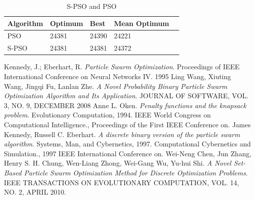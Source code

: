 \documentclass{article}
\begin{document}
\begin{table}[h]
\begin{tabular}{|l|l|l|l|l|}
	\hline
	Algorithm & Optimum & Best & Mean Optimum\\ \hline
	PSO & 24381 & 24390 & 24221\\ \hline
	S-PSO & 24381 & 24381 & 24372\\ \hline
\end{tabular}
\caption{S-PSO and PSO}
\end{table}

\newpage

\begin{thebibliography}{99}
		Kennedy, J.; Eberhart, R.
		\emph{Particle Swarm Optimization}.
		Proceedings of IEEE International Conference on Neural Networks IV.
		1995
		Ling Wang, Xiuting Wang, Jingqi Fu, Lanlan Zhe.
	  	\emph{A Novel Probability Binary Particle Swarm Optimization Algorithm and Its Application}.
	  	JOURNAL OF SOFTWARE, VOL. 3, NO. 9, DECEMBER 2008
		Anne L. Oken.
		\emph{Penalty functions and the knapsack problem}.
		Evolutionary Computation, 1994. IEEE World Congress on Computational Intelligence., Proceedings of the First IEEE Conference on.
		James Kennedy, Russell C. Eberhart.
		\emph{A discrete binary version of the particle swarm algorithm}.
		Systems, Man, and Cybernetics, 1997. Computational Cybernetics and Simulation., 1997 IEEE International Conference on.
		Wei-Neng Chen, Jun Zhang, Henry S. H. Chung, Wen-Liang Zhong, Wei-Gang Wu, Yu-hui Shi.
		\emph{A Novel Set-Based Particle Swarm Optimization Method for Discrete Optimization Problems}.
		IEEE TRANSACTIONS ON EVOLUTIONARY COMPUTATION, VOL. 14, NO. 2, APRIL 2010.
\end{thebibliography}
\end{document}
